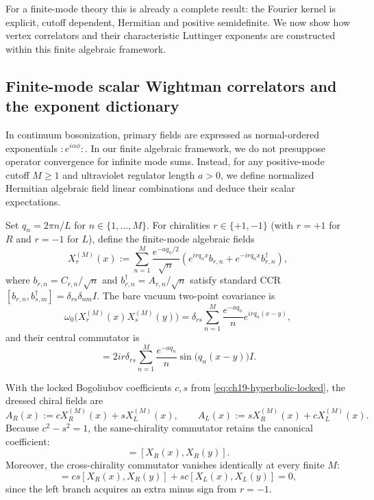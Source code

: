 For a finite-mode theory this is already a complete result: the
Fourier kernel is explicit, cutoff dependent, Hermitian and positive
semidefinite.  We now show how vertex correlators and their characteristic
Luttinger exponents are constructed within this finite algebraic framework.

\subsection*{Finite-mode scalar Wightman correlators and the exponent dictionary}

In continuum bosonization, primary fields are expressed as normal-ordered exponentials
$:\!e^{i\alpha\phi}\!:$.  In our finite algebraic framework, we do not presuppose operator
convergence for infinite mode sums.  Instead, for any positive-mode cutoff $M \geq 1$ and
ultraviolet regulator length $a > 0$, we define normalized Hermitian algebraic field
linear combinations and deduce their scalar expectations.

Set $q_n = 2\pi n / L$ for $n \in \{1, \ldots, M\}$.  For chiralities $r \in \{+1, -1\}$
(with $r = +1$ for $R$ and $r = -1$ for $L$), define the finite-mode algebraic fields
\begin{equation}
 X_r^{(M)}(x) := \sum_{n=1}^M \frac{e^{-a q_n/2}}{\sqrt{n}}
 \left( e^{i r q_n x} b_{r,n} + e^{-i r q_n x} b_{r,n}^\dagger \right),
 \label{eq:ch19-normalized-field}
\end{equation}
where $b_{r,n} = C_{r,n}/\sqrt{n}$ and $b_{r,n}^\dagger = A_{r,n}/\sqrt{n}$ satisfy
standard CCR $[b_{r,n}, b_{s,m}^\dagger] = \delta_{rs}\delta_{nm} I$.
The bare vacuum two-point covariance is
\begin{equation}
 \omega_0\bigl(X_r^{(M)}(x) X_s^{(M)}(y)\bigr)
  = \delta_{rs} \sum_{n=1}^M \frac{e^{-a q_n}}{n} e^{i r q_n(x-y)},
 \label{eq:ch19-field-covariance}
\end{equation}
and their central commutator is
\begin{equation}
 [X_r^{(M)}(x), X_s^{(M)}(y)]
  = 2 i r \delta_{rs} \sum_{n=1}^M \frac{e^{-a q_n}}{n} \sin\bigl(q_n(x-y)\bigr) I.
 \label{eq:ch19-field-commutator}
\end{equation}

With the locked Bogoliubov coefficients $c, s$ from \eqref{eq:ch19-hyperbolic-locked},
the dressed chiral fields are
\begin{equation}
 A_R(x) := c X_R^{(M)}(x) + s X_L^{(M)}(x), \qquad
 A_L(x) := s X_R^{(M)}(x) + c X_L^{(M)}(x).
 \label{eq:ch19-dressed-chiral-fields}
\end{equation}
Because $c^2 - s^2 = 1$, the same-chirality commutator retains the canonical coefficient:
\begin{equation}
 [A_R(x), A_R(y)] = [X_R(x), X_R(y)].
\end{equation}
Moreover, the cross-chirality commutator vanishes identically at every finite $M$:
\begin{equation}
 [A_R(x), A_L(y)] = c s [X_R(x), X_R(y)] + s c [X_L(x), X_L(y)] = 0,
 \label{eq:ch19-cross-chiral-comm-zero}
\end{equation}
since the left branch acquires an extra minus sign from $r = -1$.

